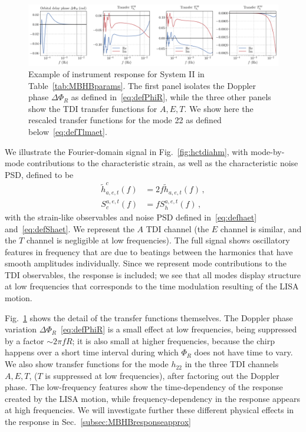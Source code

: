 \documentclass[aps,showpacs,twocolumn,prd,superscriptaddress,nofootinbib]{revtex4-1}
\newcommand{\bsub}{\begin{subequations}}
\newcommand{\esub}{\end{subequations}}
\begin{document}
\begin{figure}
  \centering
  \includegraphics[width=.98\linewidth]{../plots/plot_smbh9_tdi.pdf}
  \caption{Example of instrument response for System II in Table~\ref{tab:MBHBparams}. The first panel isolates the Doppler phase $\Delta\Phi_{R}$ as defined in~\eqref{eq:defPhiR}, while the three other panels show the TDI transfer functions for $A,E,T$. We show here the rescaled transfer functions for the mode 22 as defined below~\eqref{eq:defTlmaet}.}
  \label{fig:tranferSMBHCase9}
\end{figure}

We illustrate the Fourier-domain signal in Fig.~\ref{fig:hctdiahm}, with mode-by-mode contributions to the characteristic strain, as well as the characteristic noise PSD, defined to be
\bsub\label{eq:defhc}
\begin{align}
	\tilde{h}_{a,e,t}^{c} (f) &= 2 f \tilde{h}_{a,e,t} (f) \,,\\
	S^{a,e,t}_{c} (f) &= f S^{a,e,t}_{h} (f) \,,
\end{align}
\esub
with the strain-like observables and noise PSD defined in~\eqref{eq:defhaet} and~\eqref{eq:defShaet}. We represent the $A$ TDI channel (the $E$ channel is similar, and the $T$ channel is negligible at low frequencies). The full signal shows oscillatory features in frequency that are due to beatings between the harmonics that have smooth amplitudes individually. Since we represent mode contributions to the TDI observables, the response is included; we see that all modes display structure at low frequencies that corresponds to the time modulation resulting of the LISA motion.

Fig.~\ref{fig:tranferSMBHCase9} shows the detail of the transfer functions themselves. The Doppler phase variation $\Delta \Phi_{R}$~\eqref{eq:defPhiR} is a small effect at low frequencies, being suppressed by a factor $\sim 2\pi f R$; it is also small at higher frequencies, because the chirp happens over a short time interval during which $\Phi_{R}$ does not have time to vary. We also show transfer functions for the mode $h_{22}$ in the three TDI channels $A,E,T$, ($T$ is suppressed at low frequencies), after factoring out the Doppler phase. The low-frequency features show the time-dependency of the response created by the LISA motion, while frequency-dependency in the response appears at high frequencies. We will investigate further these different physical effects in the response in Sec.~\ref{subsec:MBHBresponseapprox}
\end{document}
